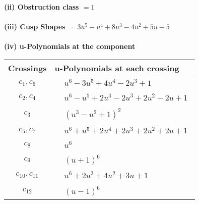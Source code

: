 \documentclass[1p]{elsarticle_modified}
\theoremstyle{definition}
\begin{document}
\flushleft \textbf{(ii) Obstruction class $= 1$}\\~\\
\flushleft \textbf{(iii) Cusp Shapes $= 3 u^5- u^4+8 u^3-4 u^2+5 u-5$}\\~\\
\newpage\renewcommand{\arraystretch}{1}
\flushleft \textbf{(iv) u-Polynomials at the component}\newline \\
\begin{tabular}{m{50pt}|m{274pt}}
Crossings & \hspace{64pt}u-Polynomials at each crossing \\
\hline $$\begin{aligned}c_{1},c_{6}\end{aligned}$$&$\begin{aligned}
&u^6-3 u^5+4 u^4-2 u^3+1
\end{aligned}$\\
\hline $$\begin{aligned}c_{2},c_{4}\end{aligned}$$&$\begin{aligned}
&u^6- u^5+2 u^4-2 u^3+2 u^2-2 u+1
\end{aligned}$\\
\hline $$\begin{aligned}c_{3}\end{aligned}$$&$\begin{aligned}
&(u^3- u^2+1)^2
\end{aligned}$\\
\hline $$\begin{aligned}c_{5},c_{7}\end{aligned}$$&$\begin{aligned}
&u^6+u^5+2 u^4+2 u^3+2 u^2+2 u+1
\end{aligned}$\\
\hline $$\begin{aligned}c_{8}\end{aligned}$$&$\begin{aligned}
&u^6
\end{aligned}$\\
\hline $$\begin{aligned}c_{9}\end{aligned}$$&$\begin{aligned}
&(u+1)^6
\end{aligned}$\\
\hline $$\begin{aligned}c_{10},c_{11}\end{aligned}$$&$\begin{aligned}
&u^6+2 u^3+4 u^2+3 u+1
\end{aligned}$\\
\hline $$\begin{aligned}c_{12}\end{aligned}$$&$\begin{aligned}
&(u-1)^6
\end{aligned}$\\
\hline
\end{tabular}\\~\\
\end{document}
